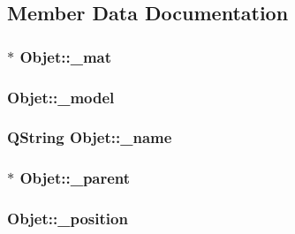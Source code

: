 \subsection{Member Data Documentation}
\hypertarget{class_objet_aefea82be8c63504190ac63d5e44ff61a}{
\subsubsection[{\+\_\+mat}]{$\ast$ Objet\+::\+\_\+mat\hspace{0.3cm}{\ttfamily [protected]}}}\label{class_objet_aefea82be8c63504190ac63d5e44ff61a}
\hypertarget{class_objet_a1963cca59f62c7a6f69a9c2c461ad9ea}{
\subsubsection[{\+\_\+model}]{ Objet\+::\+\_\+model\hspace{0.3cm}{\ttfamily [protected]}}}\label{class_objet_a1963cca59f62c7a6f69a9c2c461ad9ea}
\hypertarget{class_objet_ac19f568a794dd9387386ee71914a868e}{
\subsubsection[{\+\_\+name}]{\setlength{\rightskip}{0pt plus 5cm}Q\+String Objet\+::\+\_\+name\hspace{0.3cm}{\ttfamily [protected]}}}\label{class_objet_ac19f568a794dd9387386ee71914a868e}
\hypertarget{class_objet_a91c5a50011c3fe9233a645aa767a275f}{
\subsubsection[{\+\_\+parent}]{$\ast$ Objet\+::\+\_\+parent\hspace{0.3cm}{\ttfamily [protected]}}}\label{class_objet_a91c5a50011c3fe9233a645aa767a275f}
\hypertarget{class_objet_a6c1a10fa5f4c5cd0e0617d93f42d927b}{
\subsubsection[{\+\_\+position}]{ Objet\+::\+\_\+position\hspace{0.3cm}{\ttfamily [protected]}}}\label{class_objet_a6c1a10fa5f4c5cd0e0617d93f42d927b}
